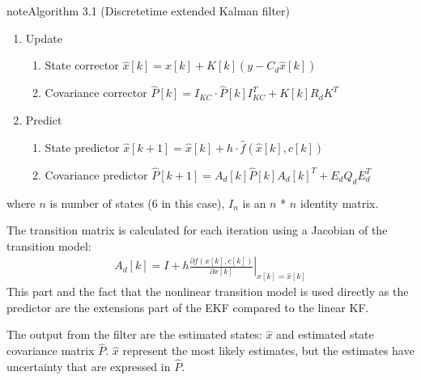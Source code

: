 \documentclass[review]{elsarticle}
\begin{document}
\begin{sphinxadmonition}{note}{Algorithm 3.1 (Discrete\sphinxhyphen{}time extended Kalman filter)}
\begin{enumerate}
\begin{enumerate}
\item {} 
\sphinxAtStartPar
Update
\begin{enumerate}
%
\item {} 
\sphinxAtStartPar
State corrector
\(\hat{x}[k] = \hat{x}[k] + K[k] (y - C_d \hat{x}[k]) \)

\item {} 
\sphinxAtStartPar
Covariance corrector
\(\hat{P}[k] = I_{KC} \cdot \hat{P}[k] I_{KC}^T + K[k] R_d K^T \)

\end{enumerate}

\item {} 
\sphinxAtStartPar
Predict
\begin{enumerate}
%
\item {} 
\sphinxAtStartPar
State predictor
\(\hat{x}[k+1] = \hat{x}[k] + h \cdot \hat{f}(\hat{x}[k], c[k])\)

\item {} 
\sphinxAtStartPar
Covariance predictor
\(\hat{P}[k+1] = A_d[k]  \hat{P}[k] A_d[k]^T + E_d Q_d E_d^T \)

\end{enumerate}

\end{enumerate}

\end{enumerate}
\end{sphinxadmonition}

\sphinxAtStartPar
where \(n\) is number of states (6 in this case), \(I_n\) is an \(n\) * \(n\) identity matrix.

\sphinxAtStartPar
The transition matrix is calculated for each iteration using a Jacobian of the transition model:
\begin{equation}\label{equation:04.01_EK:eqjacobi}
\begin{split}A_d[k] = I + h \left. \frac{\partial f \left(x[k],c[k] \right)}{\partial x[k]} \right|_{x[k]=\hat{x}[k]}\end{split}
\end{equation}
\sphinxAtStartPar
This part and the fact that the nonlinear transition model is used directly as the predictor are the extensions part of the EKF compared to the linear KF.

\sphinxAtStartPar
The output from the filter are the estimated states: \(\hat{x}\) and estimated state covariance matrix \(\hat{P}\). \(\hat{x}\) represent the most likely estimates, but the estimates have uncertainty that are expressed in \(\hat{P}\).
\end{document}
